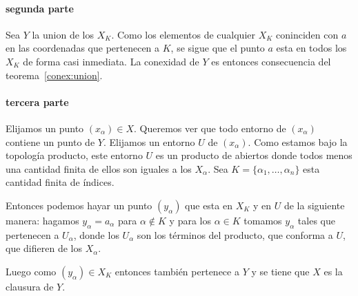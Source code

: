 \documentclass[fleqn,leqno,letterpaper,11pt,final]{article}
\begin{document}
\paragraph{segunda parte}
Sea $Y$ la union de los $X_K$. Como los elementos de cualquier $X_K$ coninciden con
$a$ en las coordenadas que pertenecen a $K$, se sigue que el punto $a$ esta en
todos los $X_K$ de forma casi inmediata. La conexidad de $Y$ es entonces consecuencia del
teorema~\ref{conex:union}.

\paragraph{tercera parte}
Elijamos un punto $(x_\alpha)\in X$. Queremos ver que todo entorno de $(x_\alpha)$ contiene
un punto de $Y$. Elijamos un entorno $U$ de $(x_\alpha)$. Como estamos bajo
la topología producto, este entorno $U$ es un producto de abiertos donde todos
menos una cantidad finita de ellos son iguales a los $X_\alpha$. Sea
$K=\{\alpha_1,\dots,\alpha_n\}$ esta cantidad finita de índices.

Entonces podemos hayar un punto $(y_\alpha)$ que esta en $X_K$ y  en $U$ de la siguiente manera:
hagamos $y_\alpha=a_\alpha$ para $\alpha\notin K$ y para los $\alpha\in K$ tomamos $y_\alpha$
tales que pertenecen a $U_\alpha$, donde los $U_\alpha$ son los términos
del producto, que conforma a $U$, que difieren de los $X_\alpha$.

Luego como $(y_\alpha)\in X_K$ entonces también pertenece a $Y$ y se tiene
que $X$ es la clausura de $Y$.
\end{document}

